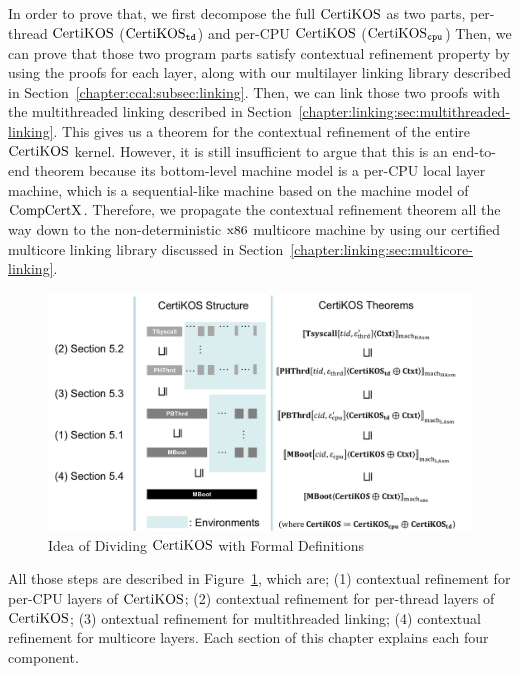 In order to  prove that, we first decompose the full $\mathrm{CertiKOS}$ as two parts, 
per-thread $\mathrm{CertiKOS}$ ($\mathrm{CertiKOS}_{{\mathrm{\texttt{td}}}}$) and per-CPU $\mathrm{CertiKOS}$ ($\mathrm{CertiKOS}_{{\mathrm{\texttt{cpu}}}}$)
Then, we can prove that those two program parts satisfy contextual refinement property by using the proofs for each layer, 
along with our multilayer linking library described in Section~\ref{chapter:ccal:subsec:linking}. 
Then, we can link those two proofs with the multithreaded linking described in Section~\ref{chapter:linking:sec:multithreaded-linking}. 
This gives us a theorem for the contextual refinement of the entire $\mathrm{CertiKOS}$ kernel. 
However, it is still insufficient to argue that this is an end-to-end theorem because its bottom-level machine model is a per-CPU local layer machine, 
which is a sequential-like machine based on the machine model of 
$\mathrm{CompCertX}$.  %
 Therefore, we propagate the contextual refinement theorem all the way down to the non-deterministic $\mathrm{x86}$ 
 multicore machine by using our certified multicore linking library discussed in Section~\ref{chapter:linking:sec:multicore-linking}.
\begin{figure}
\includegraphics[width=\textwidth, page=1]{figs/certikos/concurrent_linking}
\caption{Idea of Dividing $\mathrm{CertiKOS}$ with Formal Definitions} 
\label{fig:chapter:certikos:idea-of-dividing-certikos-with-formal-def}
\end{figure}
All those steps are described in Figure~\ref{fig:chapter:certikos:idea-of-dividing-certikos-with-formal-def},
which are; (1) contextual refinement for per-CPU layers of $\mathrm{CertiKOS}$; (2) contextual refinement for per-thread layers of $\mathrm{CertiKOS}$;
(3) ontextual refinement for multithreaded linking; (4) contextual refinement for multicore layers.
Each section of this chapter explains each four component.
%
